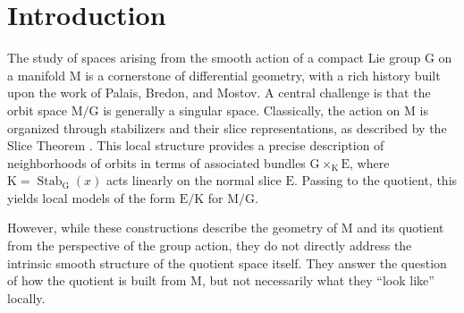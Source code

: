 \documentclass[10pt,reqno,letterpaper,twoside]{amsart}
\theoremstyle{article}
\def \E{\mathrm E}
\def \G{\mathrm G}
\def \K{\mathrm K}
\def \M{\mathrm M}
\DeclareMathOperator{\Stab}{Stab}
\begin{document}
  \begin{abstract}
    We investigate the correspondence between the geometry of a smooth action of a compact Lie group on a manifold $\M$ and the intrinsic smooth structure of the orbit space $\M/\G$.
    The latter is captured by the \emph{Klein stratification},
    which partitions $\M/\G$ into orbits of local diffeomorphisms,
    thereby classifying the space according to its intrinsic singularity types.
    We show that the geometry of the action maps coherently to this stratification through a finer partition of $\M$,
    the \emph{isostabilizer decomposition},
    whose elements are the connected components of submanifolds where the stabilizer subgroup is constant.
    Our main result establishes that the canonical projection induces a surjective map from the components of this decomposition to the Klein strata of $\M/\G$.
    As a corollary,
    we define by pullback a new canonical stratification on $\M$,
    the \emph{Inverse Klein Stratification},
    and clarify its precise relationship with the intrinsic geometry of the quotient.
  \end{abstract}
  
  \section*{Introduction}
  
  The study of spaces arising from the smooth action of a compact Lie group $\G$ on a manifold $\M$ is a cornerstone of differential geometry,
  with a rich history built upon the work of Palais, Bredon, and Mostov.
  A central challenge is that the orbit space $\M/\G$ is generally a singular space.
  Classically,
  the action on $\M$ is organized through stabilizers and their slice representations,
  as described by the Slice Theorem \cite{Bre72, Pal60}.
  This local structure provides a precise description of neighborhoods of orbits in terms of associated bundles $\G\times_{\K}\E$,
  where $\K=\Stab_\G(x)$ acts linearly on the normal slice $\E$.
  Passing to the quotient,
  this yields local models of the form $\E/\K$ for $\M/\G$.
  
  However,
  while these constructions describe the geometry of $\M$ and its quotient from the perspective of the group action,
  they do not directly address the intrinsic smooth structure of the quotient space itself.
  They answer the question of how the quotient is built from $\M$,
  but not necessarily what they ``look like'' locally.
  
\end{document}
